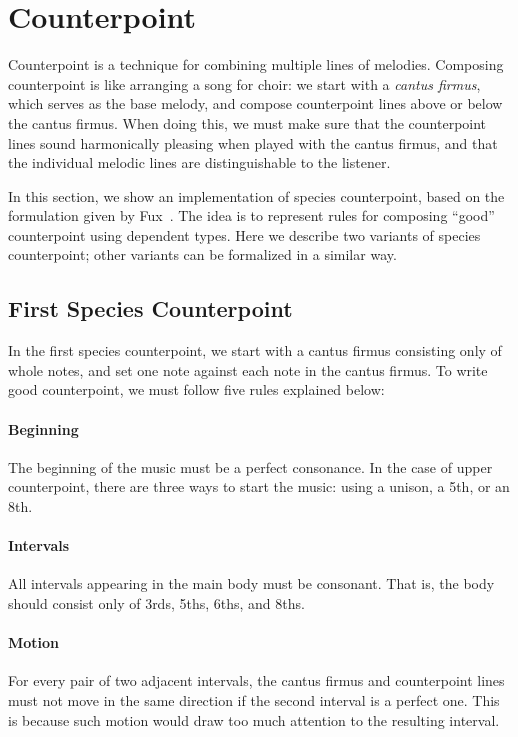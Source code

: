 \section{Counterpoint}
\label{sec:cp}

Counterpoint is a technique for combining multiple lines of melodies.
Composing counterpoint is like arranging a song for choir:
we start with a \emph{cantus firmus}, which serves as the base melody,
and compose counterpoint lines above or below the cantus firmus.
When doing this, we must make sure that the counterpoint lines sound
harmonically pleasing when played with the cantus firmus,
and that the individual melodic lines are distinguishable to the listener.

In this section, we show an implementation of species counterpoint, 
based on the formulation given by Fux~\cite{fux-cp}.
The idea is to represent rules for composing ``good'' counterpoint
using dependent types.
Here we describe two variants of species counterpoint;
other variants can be formalized in a similar way.

\subsection{First Species Counterpoint}
\label{sec:cp:fs}

In the first species counterpoint, we start with a cantus firmus
consisting only of whole notes,
and set one note against each note in the cantus firmus.
To write good counterpoint, we must follow five rules explained below:

\paragraph{Beginning}
The beginning of the music must be a perfect consonance.
In the case of upper counterpoint, there are three ways to start the music:
using a unison, a 5th, or an 8th.

\paragraph{Intervals}
All intervals appearing in the main body must be consonant.
That is, the body should consist only of 3rds, 5ths, 6ths, and 8ths.

\paragraph{Motion}
For every pair of two adjacent intervals, the cantus firmus and counterpoint
lines must not move in the same direction if the second interval is a perfect one.
This is because such motion would draw too much attention
to the resulting interval.

